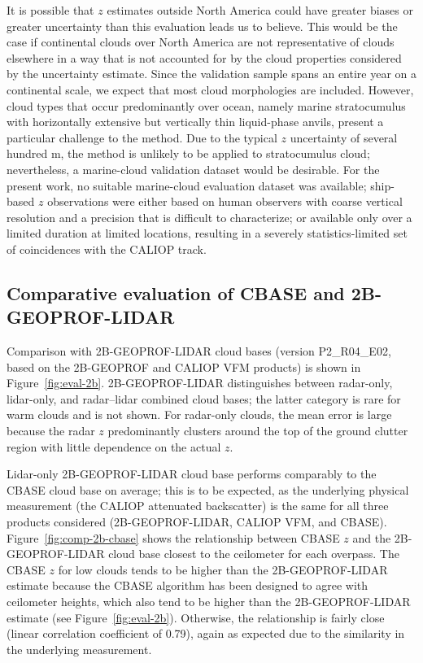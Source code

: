 \documentclass[essd,manuscript]{copernicus}
\begin{document}
It is possible that \ensuremath{z}{} estimates outside North America could have greater
biases or greater uncertainty than this evaluation leads us to believe.  This
would be the case if continental clouds over North America are not
representative of clouds elsewhere in a way that is not accounted for by the
cloud properties considered by the uncertainty estimate.  Since the validation
sample spans an entire year on a continental scale, we expect that most cloud
morphologies are included.
However, cloud types that occur predominantly over ocean, namely marine stratocumulus with
horizontally extensive but vertically thin liquid-phase anvils, 
present a particular challenge to the method.  Due to the
typical \ensuremath{z}{} uncertainty of several hundred m, the method is unlikely to be
applied to stratocumulus cloud; nevertheless, a marine-cloud validation dataset
would be desirable.  For the present work, no suitable marine-cloud evaluation
dataset was available; ship-based \ensuremath{z}{} observations were either based on human
observers with coarse vertical resolution and a precision that is difficult to
characterize; or available only over a limited duration at limited
locations, resulting in a severely statistics-limited set of coincidences with
the CALIOP track.

\subsection{Comparative evaluation of CBASE and 2B-GEOPROF-LIDAR}

Comparison with 2B-GEOPROF-LIDAR cloud bases (version P2\_R04\_E02, based on the
2B-GEOPROF and CALIOP VFM products) is shown in Figure~\ref{fig:eval-2b}.
2B-GEOPROF-LIDAR distinguishes between radar-only, lidar-only, and radar--lidar
combined cloud bases; the latter category is rare for warm clouds and is not
shown.  For radar-only clouds, the mean error is large because the radar \ensuremath{z}{}
predominantly clusters around the top of the ground clutter region with little
dependence on the actual \ensuremath{z}{}.  

Lidar-only 2B-GEOPROF-LIDAR cloud base performs comparably to the CBASE cloud
base on average; this is to be expected, as the underlying physical measurement
(the CALIOP attenuated backscatter) is the same for all three products
considered (2B-GEOPROF-LIDAR, CALIOP VFM, and CBASE).
Figure~\ref{fig:comp-2b-cbase} shows the relationship between CBASE \ensuremath{z}{} and
the 2B-GEOPROF-LIDAR cloud base closest to the ceilometer for each overpass.
The CBASE \ensuremath{z}{} for low clouds tends to be higher than the 2B-GEOPROF-LIDAR
estimate because the CBASE algorithm has been designed to agree with ceilometer
heights, which also tend to be higher than the 2B-GEOPROF-LIDAR estimate (see
Figure~\ref{fig:eval-2b}).  Otherwise, the relationship is fairly close (linear
correlation coefficient of 0.79), again as expected due to the similarity in the
underlying measurement.
\end{document}
